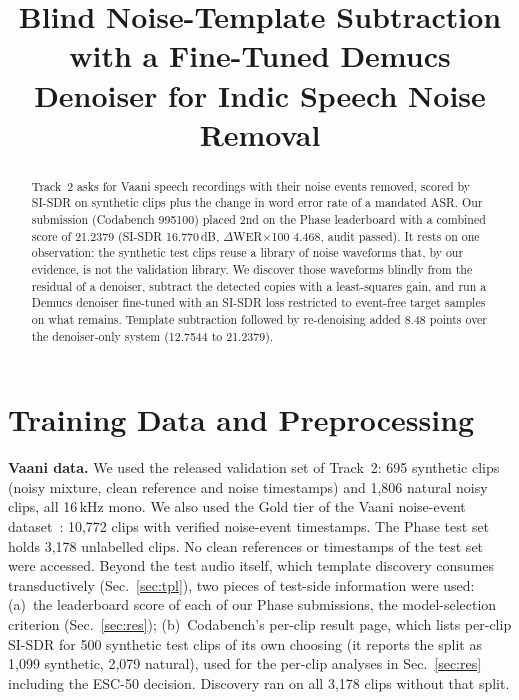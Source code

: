 \documentclass[conference]{IEEEtran}
\begin{document}
\title{Blind Noise-Template Subtraction with a Fine-Tuned Demucs Denoiser for Indic Speech Noise Removal}

\author{
}

\maketitle

\begin{abstract}
Track~2 asks for Vaani speech recordings with their noise events removed, scored by SI\nobreakdash-SDR on synthetic
clips plus the change in word error rate of a mandated ASR. Our submission (Codabench 995100) placed 2nd on the
Phase leaderboard with a combined score of 21.2379 (SI\nobreakdash-SDR 16.770\,dB,
$\Delta$WER$\times$100 4.468, audit passed). It rests on one observation: the synthetic test clips reuse a library of
noise waveforms that, by our evidence, is not the validation library.
We discover those waveforms blindly from the residual of a denoiser, subtract the detected copies with a least-squares
gain, and run a Demucs denoiser fine-tuned with an SI\nobreakdash-SDR loss restricted to event-free target samples on
what remains. Template subtraction followed by re-denoising added 8.48 points over the denoiser-only system
(12.7544 to 21.2379).
\end{abstract}

\section{Training Data and Preprocessing}
\textbf{Vaani data.} We used the released validation set of Track~2: 695 synthetic clips (noisy mixture, clean
reference and noise timestamps) and 1,806 natural noisy clips, all 16\,kHz mono. We also used the Gold tier of the
Vaani noise-event dataset~\cite{vaani}: 10,772 clips with verified noise-event timestamps. The Phase test set holds
3,178 unlabelled clips. No clean references or timestamps of the test set were accessed. Beyond the test audio
itself, which template discovery consumes transductively (Sec.~\ref{sec:tpl}), two pieces of test-side information
were used: (a)~the leaderboard score of each of our Phase submissions, the model-selection criterion
(Sec.~\ref{sec:res}); (b)~Codabench's per-clip result page, which lists per-clip SI\nobreakdash-SDR for 500 synthetic
test clips of its own choosing (it reports the split as 1,099 synthetic, 2,079 natural), used for the per-clip
analyses in Sec.~\ref{sec:res} including the ESC-50 decision. Discovery ran on all 3,178 clips without that split.
\end{document}
